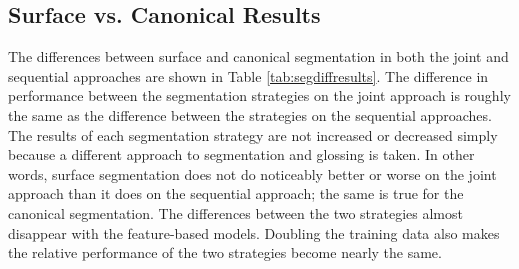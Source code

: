 \subsection{Surface vs. Canonical Results}

The differences between surface and canonical segmentation in both the joint and sequential approaches are shown in Table \ref{tab:segdiffresults}. The difference in performance between the segmentation strategies on the joint approach is roughly the same as the difference between the strategies on the sequential approaches. The results of each segmentation strategy are not increased or decreased simply because a different approach to segmentation and glossing is taken. In other words, surface segmentation does not do noticeably better or worse on the joint approach than it does on the sequential approach; the same is true for the canonical segmentation. The differences between the two strategies almost disappear with the feature-based models. Doubling the training data also makes the relative performance of the two strategies become nearly the same.


